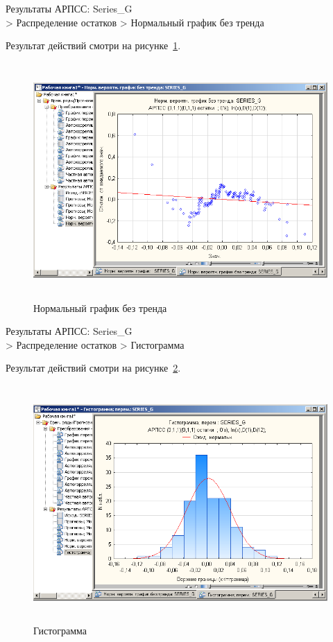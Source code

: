 
\newpage

Результаты АРПСС: Series\_G\\
> Распределение остатков
> Нормальный график без тренда

Результат действий смотри на рисунке~\ref{fig:18}.

\begin{figure}[!h]
  \centering

  \includegraphics[height=9cm]
  {inc/18.PNG}

  \caption{Нормальный график без тренда}

  \label{fig:18}
\end{figure}

Результаты АРПСС: Series\_G\\
> Распределение остатков
> Гистограмма

Результат действий смотри на рисунке~\ref{fig:19}.

\begin{figure}[!h]
  \centering

  \includegraphics[height=9cm]
  {inc/19.PNG}

  \caption{Гистограмма}

  \label{fig:19}
\end{figure}

